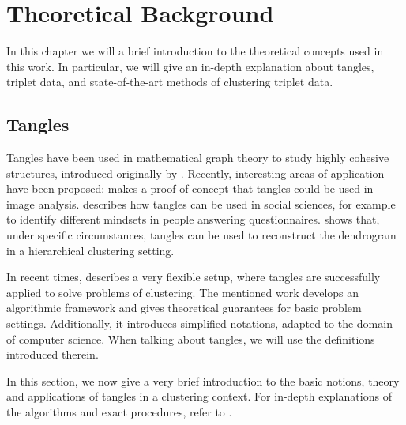 \chapter{Theoretical Background}\label{theory}
In this chapter we will a brief introduction to the theoretical concepts used in this work. 
In particular, we will give an in-depth explanation about tangles, triplet data, and state-of-the-art methods of clustering triplet data.

\section{Tangles}\label{theory:tangles}
Tangles have been used in mathematical graph theory to study highly cohesive structures, 
introduced originally by \cite{robertsonGraphMinorsObstructions1991}. 
Recently, interesting areas of application have been proposed:
\cite{diestelTanglesMonaLisa2017} makes a proof of concept that tangles could 
be used in image analysis.
\cite{diestelTanglesSocialSciences2019} describes how tangles can be used in social sciences, for 
example to identify different mindsets in people answering questionnaires.
\citep{fluckTanglesSingleLinkage2019} shows that, under specific circumstances, tangles can be
used to reconstruct the dendrogram in a hierarchical clustering setting. 

In recent times, \cite{klepperClusteringTanglesAlgorithmic2021} describes a very flexible setup,
where tangles are successfully applied to solve problems of clustering. 
The mentioned work develops an algorithmic framework and gives theoretical guarantees for 
basic problem settings.
Additionally, it introduces simplified notations, adapted to the domain of computer science. 
When talking about tangles, we will use the definitions introduced therein. 

In this section, we now give a very brief introduction to the basic notions, theory and applications of tangles in a clustering context.
For in-depth explanations of the algorithms and exact procedures, refer to 
\cite{klepperClusteringTanglesAlgorithmic2021}.


